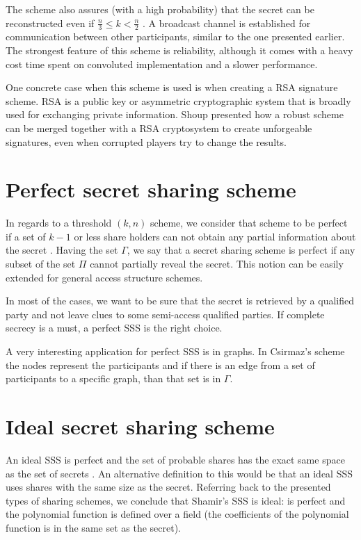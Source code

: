 \documentclass[12pt, a4paper, oneside]{book}
\begin{document}
    The scheme also assures (with a high probability) that the secret can be reconstructed even if $\tfrac{n}{3}{\leq}k{<}\tfrac{n}{2}$ \cite{Rabin1994RobustSO}. A broadcast channel is established for communication between other participants, similar to the one presented earlier. The strongest feature of this scheme is reliability, although it comes with a heavy cost time spent on convoluted implementation and a slower performance.
    
    One concrete case when this scheme is used is when creating a RSA signature scheme. RSA is a public key or asymmetric cryptographic system that is broadly used for exchanging private information. Shoup \cite{PracticalThresholdS} presented how a robust scheme can be merged together with a RSA cryptosystem to create unforgeable signatures, even when corrupted players try to change the results.
    \section{Perfect secret sharing scheme}
    In regards to a threshold $ (k, n) $ scheme, we consider that scheme to be perfect if a set of $k{-}1 $ or less share holders can not obtain any partial information about the secret \cite{CombATS}.
    Having the set $\Gamma$, we say that a secret sharing scheme is perfect if any subset of the set $\Pi$ cannot partially reveal the secret. This notion can be easily extended for general access structure schemes.
    
    In most of the cases, we want to be sure that the secret is retrieved by a qualified party and not leave clues to some semi-access qualified parties. If complete secrecy is a must, a perfect SSS is the right choice.
    
    A very interesting  application for perfect SSS is in graphs. In Csirmaz's scheme \cite{PerfectGraph} the nodes represent the participants and if there is an edge from a set of participants to a specific graph, than that set is in $ \Gamma $.
    \section{Ideal secret sharing scheme}
    An ideal SSS is perfect and the set of probable shares has the exact same space as the set of secrets \cite{IdealSSS}. An alternative definition to this would be that an ideal SSS uses shares with the same size as the secret. Referring back to the presented types of sharing schemes, we conclude that Shamir's \cite{ShareASecret} SSS is ideal: is perfect and the polynomial function is defined over a field (the coefficients of the polynomial function is in the same set as the secret).
    
\end{document}
